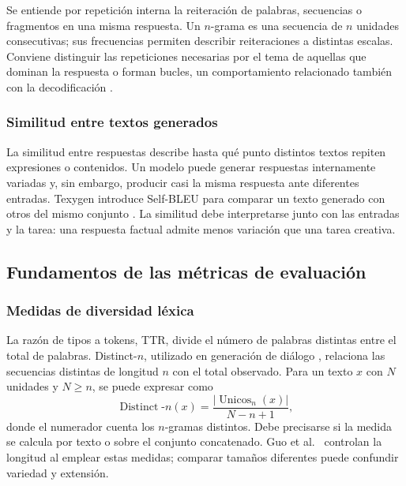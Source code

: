 \documentclass[12pt,letterpaper]{article}
\begin{document}
Se entiende por repetición interna la reiteración de palabras, secuencias
o fragmentos en una misma respuesta. Un \(n\)-grama es una secuencia de
\(n\) unidades consecutivas; sus frecuencias permiten describir
reiteraciones a distintas escalas. Conviene distinguir las repeticiones
necesarias por el tema de aquellas que dominan la respuesta o forman
bucles, un comportamiento relacionado también con la decodificación
\cite{holtzman2020}.

\subsubsection{Similitud entre textos generados}

La similitud entre respuestas describe hasta qué punto distintos textos
repiten expresiones o contenidos. Un modelo puede generar respuestas
internamente variadas y, sin embargo, producir casi la misma respuesta
ante diferentes entradas. Texygen introduce Self-BLEU para comparar un
texto generado con otros del mismo conjunto \cite{zhu2018texygen}.
La similitud debe interpretarse junto con las entradas y la tarea: una
respuesta factual admite menos variación que una tarea creativa.

\subsection{Fundamentos de las métricas de evaluación}

\subsubsection{Medidas de diversidad léxica}

La razón de tipos a tokens, TTR, divide el número de palabras distintas
entre el total de palabras. Distinct-\(n\), utilizado en generación de
diálogo \cite{li2016}, relaciona las secuencias distintas de longitud
\(n\) con el total observado. Para un texto \(x\) con \(N\) unidades y
\(N\geq n\), se puede expresar como
\begin{equation}
    \operatorname{Distinct}\text{-}n(x)
    =\frac{|\operatorname{Unicos}_n(x)|}{N-n+1},
\end{equation}
donde el numerador cuenta los \(n\)-gramas distintos. Debe precisarse si
la medida se calcula por texto o sobre el conjunto concatenado. Guo
et al.\ \cite{guo2024} controlan la longitud al emplear estas medidas;
comparar tamaños diferentes puede confundir variedad y extensión.
\end{document}
